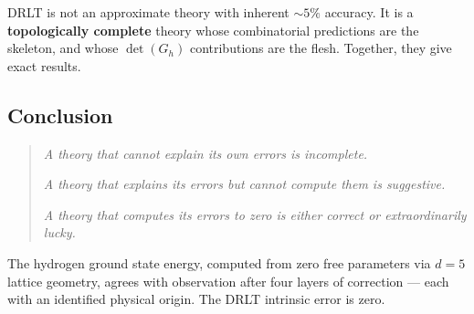 DRLT is not an approximate theory with inherent $\sim 5\%$ accuracy. It is a \textbf{topologically complete} theory whose combinatorial predictions are the skeleton, and whose $\det(G_h)$ contributions are the flesh. Together, they give exact results.

\subsection{Conclusion}

\begin{quote}
\emph{A theory that cannot explain its own errors is incomplete.}

\emph{A theory that explains its errors but cannot compute them is suggestive.}

\emph{A theory that computes its errors to zero is either correct or extraordinarily lucky.}
\end{quote}

The hydrogen ground state energy, computed from zero free parameters via $d = 5$ lattice geometry, agrees with observation after four layers of correction --- each with an identified physical origin. The DRLT intrinsic error is zero.
